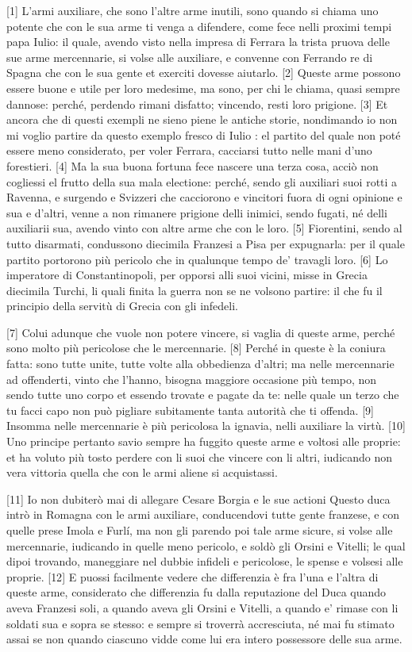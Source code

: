 {[}1{]} L'armi auxiliare, che sono l'altre arme inutili, sono quando si
chiama uno potente che con le sua arme ti venga a difendere, come fece
nelli proximi tempi papa Iulio: il quale, avendo visto nella impresa di
Ferrara la trista pruova delle sue arme mercennarie, si volse alle
auxiliare, e convenne con Ferrando re di Spagna che con le sua gente et
exerciti dovesse aiutarlo. {[}2{]} Queste arme possono essere buone e
utile per loro medesime, ma sono, per chi le chiama, quasi sempre
dannose: perché, perdendo rimani disfatto; vincendo, resti loro
prigione. {[}3{]} Et ancora che di questi exempli ne sieno piene le
antiche storie, nondimando io non mi voglio partire da questo exemplo
fresco di Iulio : el partito del quale non poté essere meno
considerato, per voler Ferrara, cacciarsi tutto nelle mani d'uno
forestieri. {[}4{]} Ma la sua buona fortuna fece nascere una terza cosa,
acciò non cogliessi el frutto della sua mala electione: perché, sendo
gli auxiliari suoi rotti a Ravenna, e surgendo e Svizzeri che cacciorono
e vincitori fuora di ogni opinione e sua e d'altri, venne a non rimanere
prigione delli inimici, sendo fugati, né delli auxiliarii sua, avendo
vinto con altre arme che con le loro. {[}5{]} Fiorentini, sendo al tutto
disarmati, condussono diecimila Franzesi a Pisa per expugnarla: per il
quale partito portorono più pericolo che in qualunque tempo de' travagli
loro. {[}6{]} Lo imperatore di Constantinopoli, per opporsi alli suoi
vicini, misse in Grecia diecimila Turchi, li quali finita la guerra non
se ne volsono partire: il che fu il principio della servitù di Grecia
con gli infedeli.

{[}7{]} Colui adunque che vuole non potere vincere, si vaglia di queste
arme, perché sono molto più pericolose che le mercennarie. {[}8{]}
Perché in queste è la coniura fatta: sono tutte unite, tutte volte alla
obbedienza d'altri; ma nelle mercennarie ad offenderti, vinto che
l'hanno, bisogna maggiore occasione più tempo, non sendo tutte uno corpo
et essendo trovate e pagate da te: nelle quale un terzo che tu facci
capo non può pigliare subitamente tanta autorità che ti offenda. {[}9{]}
Insomma nelle mercennarie è più pericolosa la ignavia, nelli auxiliare
la virtù. {[}10{]} Uno principe pertanto savio sempre ha fuggito queste
arme e voltosi alle proprie: et ha voluto più tosto perdere con li suoi
che vincere con li altri, iudicando non vera vittoria quella che con le
armi aliene si acquistassi.

{[}11{]} Io non dubiterò mai di allegare Cesare Borgia e le sue actioni
Questo duca intrò in Romagna con le armi auxiliare, conducendovi tutte
gente franzese, e con quelle prese Imola e Furlí, ma non gli parendo poi
tale arme sicure, si volse alle mercennarie, iudicando in quelle meno
pericolo, e soldò gli Orsini e Vitelli; le qual dipoi trovando,
maneggiare nel dubbie infideli e pericolose, le spense e volsesi alle
proprie. {[}12{]} E puossi facilmente vedere che differenzia è fra l'una
e l'altra di queste arme, considerato che differenzia fu dalla
reputazione del Duca quando aveva Franzesi soli, a quando aveva gli
Orsini e Vitelli, a quando e' rimase con li soldati sua e sopra se
stesso: e sempre si troverrà accresciuta, né mai fu stimato assai se non
quando ciascuno vidde come lui era intero possessore delle sua arme.

